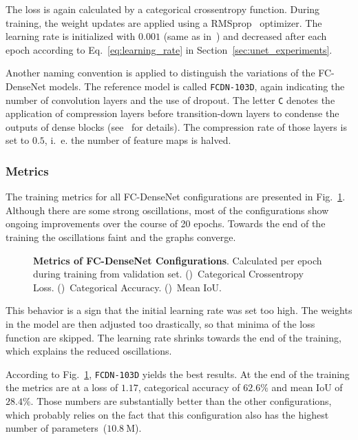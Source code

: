 The loss is again calculated by a categorical crossentropy function. During training, the weight updates are applied using a RMSprop~\cite{rmsprop14} optimizer. The learning rate is initialized with $0.001$ (same as in~\cite{denseseg17}) and decreased after each epoch according to Eq.~\ref{eq:learning_rate} in Section~\ref{sec:unet_experiments}.

Another naming convention is applied to distinguish the variations of the FC-DenseNet models. The reference model is called \texttt{FCDN-103D}, again indicating the number of convolution layers and the use of dropout. The letter \texttt{C} denotes the application of compression layers before transition-down layers to condense the outputs of dense blocks (see~\cite{denseseg17} for details). The compression rate of those layers is set to $0.5$, i.~e. the number of feature maps is halved.

\subsubsection{Metrics}
The training metrics for all FC-DenseNet configurations are presented in Fig.~\ref{fig:densenet_train_metrics}. Although there are some strong oscillations, most of the configurations show ongoing improvements over the course of 20 epochs. Towards the end of the training the oscillations faint and the graphs converge.

\begin{figure}[h]
    \newcommand{\DensenetMetricsImageWidth}{0.32\textwidth}
    \centering
            
    \caption[Metrics of FC-DenseNet Configurations]
    {\textbf{Metrics of FC-DenseNet Configurations}. Calculated per epoch during training from validation set. ()~Categorical Crossentropy Loss. ()~Categorical Accuracy. ()~Mean IoU.}
    \label{fig:densenet_train_metrics}
\end{figure}

This behavior is a sign that the initial learning rate was set too high. The weights in the model are then adjusted too drastically, so that minima of the loss function are skipped. The learning rate shrinks towards the end of the training, which explains the reduced oscillations.

According to Fig.~\ref{fig:densenet_train_metrics}, \texttt{FCDN-103D} yields the best results. At the end of the training the metrics are at a loss of $1.17$, categorical accuracy of $62.6\%$ and mean IoU of $28.4\%$. Those numbers are substantially better than the other configurations, which probably relies on the fact that this configuration also has the highest number of parameters~($10.8~\text{M}$).

